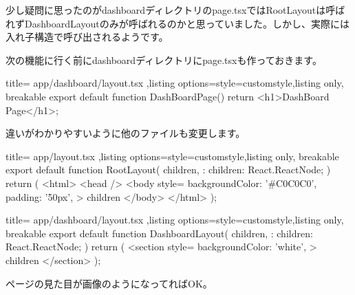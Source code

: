 少し疑問に思ったのがdashboardディレクトリのpage.tsxではRootLayoutは呼ばれずDashboardLayoutのみが呼ばれるのかと思っていました。しかし、実際には入れ子構造で呼び出されるようです。


次の機能に行く前にdashboardディレクトリにpage.tsxも作っておきます。
\begin{tcblisting}{title={
        app/dashboard/layout.tsx
      },listing options={style=customstyle},listing only, breakable}
  export default function DashBoardPage() {
      return <h1>DashBoard Page</h1>;
  }

\end{tcblisting}


違いがわかりやすいように他のファイルも変更します。
\begin{tcblisting}{title={
        app/layout.tsx
      },listing options={style=customstyle},listing only, breakable}
      export default function RootLayout({
        children,
      }: {
        children: React.ReactNode;
      }) {
        return (
          <html>
            <head />
            <body
              style={{
                backgroundColor: '#C0C0C0',
                padding: '50px',
              }}
            >
              {children}
            </body>
          </html>
        );
      }
      

\end{tcblisting}




\begin{tcblisting}{title={
        app/dashboard/layout.tsx
      },listing options={style=customstyle},listing only, breakable}
      export default function DashboardLayout({
        children,
      }: {
        children: React.ReactNode;
      }) {
        return (
          <section
            style={{
              backgroundColor: 'white',            
            }}
          >
            {children}
          </section>
        );
      }
\end{tcblisting}



ページの見た目が画像のようになってればOK。



